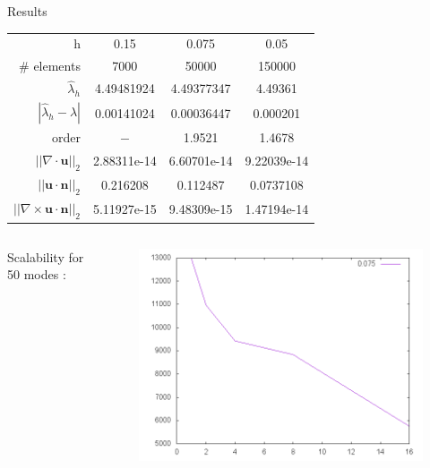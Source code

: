 \documentclass{beamer}
\newcommand{\curl}{{\nabla\times}}
\renewcommand{\div}{{\nabla\cdot}}
\begin{document}
\begin{frame}{Results}
  \begin{table}[H]
    \small
    \centering
    \begin{tabular}{r|c|c|c}
      h & 0.15 & 0.075 & 0.05 \\
      \# elements & 7000 & 50000 & 150000 \\
      \hline
      $\widehat{\lambda}_h$ & 4.49481924 & 4.49377347 & 4.49361\\
      $|\widehat{\lambda}_h-\lambda|$ & 0.00141024 & 0.00036447 & 0.000201 \\
      order & $-$ & 1.9521 & 1.4678 \\
      \hline
      $||\div\mathbf{u}||_2$ & 2.88311e-14 & 6.60701e-14 & 9.22039e-14 \\
      $||\mathbf{u}\cdot\mathbf{n}||_2$ & 0.216208 & 0.112487 & 0.0737108 \\
      $||\curl\mathbf{u}\cdot\mathbf{n}||_2$ & 5.11927e-15 & 9.48309e-15 & 1.47194e-14 \\
    \end{tabular}
  \end{table}
  \begin{columns}[onlytextwidth]
    \begin{column}{0.3\textwidth}
      Scalability for 50 modes :
    \end{column}
    \begin{column}{0.7\textwidth}
      \begin{figure}[H]
        \centering
        \includegraphics[scale=0.3]{eigen}
      \end{figure}
    \end{column}
  \end{columns}
\end{frame}
\end{document}
